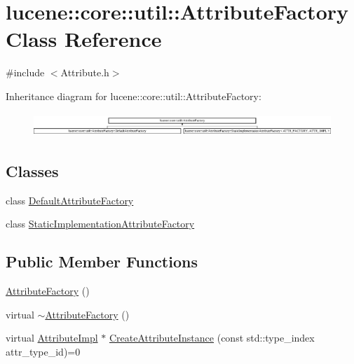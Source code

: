 \hypertarget{classlucene_1_1core_1_1util_1_1AttributeFactory}{}\section{lucene\+:\+:core\+:\+:util\+:\+:Attribute\+Factory Class Reference}
\label{classlucene_1_1core_1_1util_1_1AttributeFactory}


{\ttfamily \#include $<$Attribute.\+h$>$}

Inheritance diagram for lucene\+:\+:core\+:\+:util\+:\+:Attribute\+Factory\+:\begin{figure}[H]
\begin{center}
\leavevmode
\includegraphics[height=0.907618cm]{classlucene_1_1core_1_1util_1_1AttributeFactory}
\end{center}
\end{figure}
\subsection*{Classes}
\begin{DoxyCompactItemize}
\item 
class \mbox{\hyperlink{classlucene_1_1core_1_1util_1_1AttributeFactory_1_1DefaultAttributeFactory}{Default\+Attribute\+Factory}}
\item 
class \mbox{\hyperlink{classlucene_1_1core_1_1util_1_1AttributeFactory_1_1StaticImplementationAttributeFactory}{Static\+Implementation\+Attribute\+Factory}}
\end{DoxyCompactItemize}
\subsection*{Public Member Functions}
\begin{DoxyCompactItemize}
\item 
\mbox{\hyperlink{classlucene_1_1core_1_1util_1_1AttributeFactory_a55d388271f308e3105344163e56dddc4}{Attribute\+Factory}} ()
\item 
virtual \mbox{\hyperlink{classlucene_1_1core_1_1util_1_1AttributeFactory_a0388433c20c2b44a344c2f5838060728}{$\sim$\+Attribute\+Factory}} ()
\item 
virtual \mbox{\hyperlink{classlucene_1_1core_1_1util_1_1AttributeImpl}{Attribute\+Impl}} $\ast$ \mbox{\hyperlink{classlucene_1_1core_1_1util_1_1AttributeFactory_a88ccb9965ed78099379eaf9b1256abf3}{Create\+Attribute\+Instance}} (const std\+::type\+\_\+index attr\+\_\+type\+\_\+id)=0
\end{DoxyCompactItemize}

